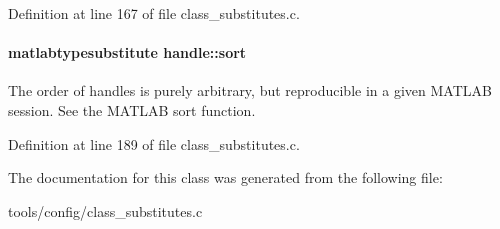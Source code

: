 Definition at line 167 of file class\+\_\+substitutes.\+c.

\hypertarget{classhandle_ad11b0be4c173a9d31122c1298eb96a97}{}
\paragraph[{sort}]{\setlength{\rightskip}{0pt plus 5cm}matlabtypesubstitute handle\+::sort}\label{classhandle_ad11b0be4c173a9d31122c1298eb96a97}
The order of handles is purely arbitrary, but reproducible in a given M\+A\+T\+L\+A\+B session. See the M\+A\+T\+L\+A\+B sort function. 

Definition at line 189 of file class\+\_\+substitutes.\+c.



The documentation for this class was generated from the following file\+:\begin{DoxyCompactItemize}
\item 
tools/config/class\+\_\+substitutes.\+c\end{DoxyCompactItemize}

